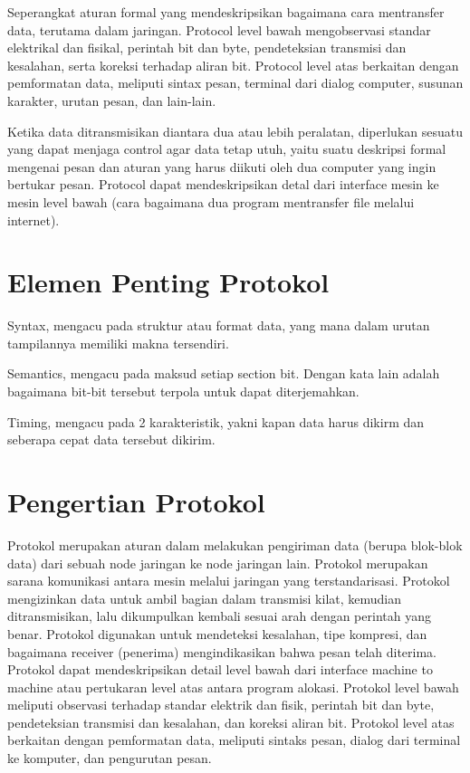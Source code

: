  Seperangkat aturan formal yang mendeskripsikan bagaimana cara mentransfer data, terutama dalam jaringan. Protocol level bawah
 mengobservasi standar elektrikal dan fisikal, perintah bit dan byte, pendeteksian transmisi dan kesalahan, serta koreksi terhadap 
 aliran bit. Protocol level atas berkaitan dengan pemformatan data, meliputi sintax pesan, terminal dari dialog computer, susunan 
 karakter, urutan pesan, dan lain-lain.
 
 Ketika data ditransmisikan diantara dua atau lebih peralatan, diperlukan sesuatu yang dapat menjaga control agar data tetap utuh, yaitu 
 suatu deskripsi formal mengenai pesan dan aturan yang harus diikuti oleh dua computer yang ingin bertukar pesan. Protocol dapat 
 mendeskripsikan detal dari interface mesin ke mesin level bawah (cara bagaimana dua program mentransfer file melalui internet).
 
 \section{Elemen Penting Protokol}
 \item  Syntax, mengacu pada struktur atau format data, yang mana dalam urutan tampilannya memiliki makna tersendiri.
 \item  Semantics, mengacu pada maksud setiap section bit. Dengan kata lain adalah bagaimana bit-bit tersebut terpola untuk dapat diterjemahkan.
 \item  Timing, mengacu pada 2 karakteristik, yakni kapan data harus dikirm dan seberapa cepat data tersebut dikirim.

 
 \section{Pengertian Protokol}
Protokol merupakan aturan dalam melakukan pengiriman data (berupa blok-blok data) dari sebuah node jaringan ke node jaringan lain.
Protokol merupakan sarana komunikasi antara mesin melalui jaringan yang terstandarisasi. Protokol mengizinkan data untuk ambil bagian dalam transmisi kilat, kemudian ditransmisikan, lalu dikumpulkan kembali sesuai arah dengan perintah yang benar. 
Protokol digunakan untuk mendeteksi kesalahan, tipe kompresi, dan bagaimana receiver (penerima) mengindikasikan bahwa pesan telah diterima. 
Protokol dapat mendeskripsikan detail level bawah dari interface machine to machine atau pertukaran level atas antara program alokasi. 
Protokol level bawah meliputi observasi terhadap standar elektrik dan fisik, perintah bit dan byte, pendeteksian transmisi dan kesalahan, dan koreksi aliran bit. 
Protokol level atas berkaitan dengan pemformatan data, meliputi sintaks pesan, dialog dari terminal ke komputer, dan pengurutan pesan. 
 

